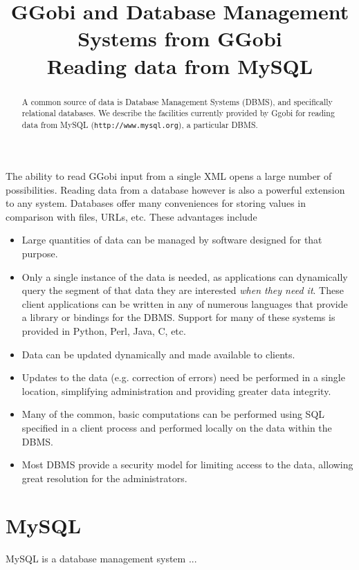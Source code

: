 \documentclass{article}
\title{GGobi and Database Management Systems from GGobi\\ 
Reading data from MySQL
}
\def\URL#1{\texttt{#1}}
\begin{document}
\maketitle

\begin{abstract}
  A common source of data is Database Management Systems (DBMS), and
  specifically relational databases.  We describe the facilities
  currently provided by Ggobi for reading data from MySQL
  (\URL{http://www.mysql.org}), a particular DBMS.
\end{abstract}

The ability to read GGobi input from a single XML opens a large number
of possibilities.  Reading data from a database however is also a
powerful extension to any system.  Databases offer many conveniences
for storing values in comparison with files, URLs, etc.
These advantages include
\begin{itemize}

\item Large quantities of data can be managed by software
 designed for that purpose. 

\item Only a single instance of the data is needed, as applications
  can dynamically query the segment of that data they are interested
  \textsl{when they need it}.  These client applications can be
  written in any of numerous languages that provide a library or
  bindings for the DBMS.  Support for many of these systems is
  provided in Python, Perl, Java, C, etc.

\item Data can be updated dynamically and made available to clients.

\item Updates to the data (e.g. correction of errors) need be
  performed in a single location, simplifying administration
and providing greater data integrity.

\item Many of the common, basic computations can be performed
using SQL specified in a client process and performed locally on the
data within the DBMS.

\item Most DBMS provide a security model for limiting access
to the data, allowing great resolution for the administrators.

\end{itemize}


\section{MySQL}
MySQL is a database management system ...
\end{document}
